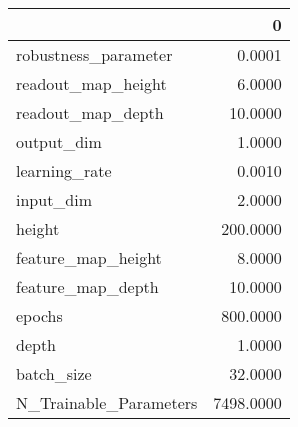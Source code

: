 \begin{tabular}{lr}
\toprule
{} &          0 \\
\midrule
robustness\_parameter   &     0.0001 \\
readout\_map\_height     &     6.0000 \\
readout\_map\_depth      &    10.0000 \\
output\_dim             &     1.0000 \\
learning\_rate          &     0.0010 \\
input\_dim              &     2.0000 \\
height                 &   200.0000 \\
feature\_map\_height     &     8.0000 \\
feature\_map\_depth      &    10.0000 \\
epochs                 &   800.0000 \\
depth                  &     1.0000 \\
batch\_size             &    32.0000 \\
N\_Trainable\_Parameters &  7498.0000 \\
\bottomrule
\end{tabular}
